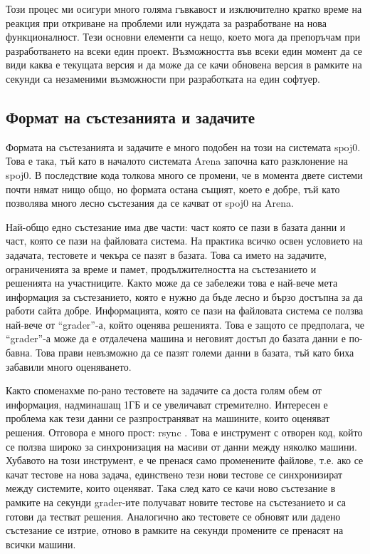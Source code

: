 \documentclass[a4paper,12pt]{article}
\begin{document}
    Този процес ми осигури много голяма гъвкавост и изключително кратко време на реакция при откриване на проблеми или нуждата за разработване на нова функционалност. Тези основни елементи са нещо, което мога да препоръчам при разработването на всеки един проект. Възможността във всеки един момент да се види каква е текущата версия и да може да се качи обновена версия в рамките на секунди са незаменими възможности при разработката на един софтуер.
    
  \subsection{Формат на състезанията и задачите}                              
    Формата на състезанията и задачите е много подобен на този на системата spoj0. Това е така, тъй като в началото системата Arena започна като разклонение на spoj0. В последствие кода толкова много се промени, че в момента двете системи почти нямат нищо общо, но формата остана същият, което е добре, тъй като позволява много лесно състезания да се качват от spoj0 на Arena.
    
    Най-общо едно състезание има две части: част която се пази в базата данни и част, която се пази на файловата система. На практика всичко освен условието на задачата, тестовете и чекъра се пазят в базата. Това са името на задачите, ограниченията за време и памет, продължителността на състезанието и решенията на участниците. Както може да се забележи това е най-вече мета информация за състезанието, която е нужно да бъде лесно и бързо достъпна за да работи сайта добре. Информацията, която се пази на файловата система се ползва най-вече от ``grader''-а, който оценява решенията. Това е защото се предполага, че ``grader''-а може да е отдалечена машина и неговият достъп до базата данни е по-бавна. Това прави невъзможно да се пазят големи данни в базата, тъй като биха забавили много оценяването.
    
    Както споменахме по-рано тестовете на задачите са доста голям обем от информация, надминашащ 1ГБ и се увеличават стремително. Интересен е проблема как тези данни се разпространяват на машините, които оценяват решения. Отговора е много прост: rsync \cite{rsync_site}. Това е инструмент с отворен код, който се ползва широко за синхронизация на масиви от данни между няколко машини. Хубавото на този инструмент, е че пренася само променените файлове, т.е. ако се качат тестове на нова задача, единствено тези нови тестове се синхронизират между системите, които оценяват. Така след като се качи ново състезание в рамките на секунди grader-ите получават новите тестове на състезанието и са готови да тестват решения. Аналогично ако тестовете се обновят или дадено състезание се изтрие, отново в рамките на секунди промените се пренасят на всички машини.
    
\end{document}
